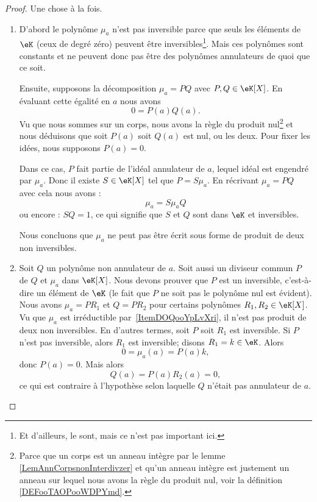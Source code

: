 \begin{proof}
    Une chose à la fois.
    \begin{enumerate}
        \item
            D'abord le polynôme \( \mu_a\) n'est pas inversible parce que seuls les éléments de \( \eK\) (ceux de degré zéro) peuvent être inversibles\footnote{Et d'ailleurs, le sont, mais ce n'est pas important ici.}. Mais ces polynômes sont constants et ne peuvent donc pas être des polynômes annulateurs de quoi que ce soit.

            Ensuite, supposons la décomposition \( \mu_a=PQ\) avec \( P,Q\in \eK[X]\). En évaluant cette égalité en \( a\) nous avons
            \begin{equation}
                0=P(a)Q(a).
            \end{equation}
            Vu que nous sommes sur un corps, nous avons la règle du produit nul\footnote{Parce que un corps est un anneau intègre par le lemme \ref{LemAnnCorpsnonInterdivzer} et qu'un anneau intègre est justement un anneau sur lequel nous avons la règle du produit nul, voir la définition \ref{DEFooTAOPooWDPYmd}.} et nous déduisons que soit \( P(a)\) soit \( Q(a)\) est nul, ou les deux. Pour fixer les idées, nous supposons \( P(a)=0\).

            Dans ce cas, \( P\) fait partie de l'idéal annulateur de \( a\), lequel idéal est engendré par \( \mu_a\). Donc il existe \( S\in \eK[X]\) tel que \( P=S\mu_a\). En récrivant \( \mu_a=PQ\) avec cela nous avons :
            \begin{equation}
                \mu_a=S\mu_aQ
            \end{equation}
            ou encore : \( SQ=1\), ce qui signifie que \( S\) et \( Q\) sont dans \( \eK\) et inversibles.

            Nous concluons que \( \mu_a\) ne peut pas être écrit sous forme de produit de deux non inversibles.
        \item
            Soit \( Q\) un polynôme non annulateur de \( a\). Soit aussi un diviseur commun \( P\) de \( Q\) et \( \mu_a\) dans \( \eK[X]\). Nous devons prouver que \( P\) est un inversible, c'est-à-dire un élément de \( \eK\) (le fait que \( P\) ne soit pas le polynôme nul est évident).
            Nous avons \( \mu_a=PR_1\) et \( Q=PR_2\) pour certains polynômes \( R_1,R_2\in \eK[X]\). Vu que \( \mu_a\) est irréductible par~\ref{ItemDOQooYpLvXri}, il n'est pas produit de deux non inversibles. En d'autres termes, soit \( P\) soit \( R_1\) est inversible. Si \( P \) n'est pas inversible, alors \( R_1\) est inversible; disons \( R_1=k\in \eK\). Alors
            \begin{equation}
                0=\mu_a(a)=P(a)k,
            \end{equation}
            donc \( P(a)=0\). Mais alors
            \begin{equation}
                Q(a)=P(a)R_2(a)=0,
            \end{equation}
            ce qui est contraire à l'hypothèse selon laquelle \( Q\) n'était pas annulateur de \( a\).


\end{enumerate}
\end{proof}

